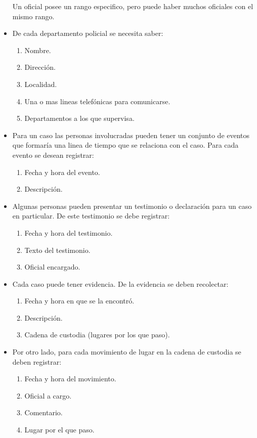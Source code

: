\documentclass{article}
\theoremstyle{definition}
\theoremstyle{remark}
\begin{document}
\begin{itemize}
    Un oficial posee un rango especifico, pero puede haber muchos oficiales con el mismo rango.
    \item De cada departamento policial se necesita saber:
        \begin{enumerate}
            \item Nombre.
            \item Dirección.
            \item Localidad.
            \item Una o mas lineas telefónicas para comunicarse.
            \item Departamentos a los que supervisa.
        \end{enumerate}
    \item Para un caso las personas involucradas pueden tener un conjunto de eventos que formaría una linea de tiempo que se relaciona con el caso. Para cada evento se desean registrar:
        \begin{enumerate}
            \item Fecha y hora del evento.
            \item Descripción.
        \end{enumerate}
    \pagebreak
    \item Algunas personas pueden presentar un testimonio o declaración para un caso en particular. De este testimonio se debe registrar:
        \begin{enumerate}
            \item Fecha y hora  del testimonio.
            \item Texto del testimonio.
            \item Oficial encargado.
        \end{enumerate}
    \item Cada caso puede tener evidencia. De la evidencia se deben recolectar:
        \begin{enumerate}
            \item Fecha y hora en que se la encontró.
            \item Descripción.
            \item Cadena de custodia (lugares por los que paso).
        \end{enumerate}
    \item Por otro lado, para cada movimiento de lugar en la cadena de custodia se deben registrar:
        \begin{enumerate}
            \item Fecha y hora del movimiento.
            \item Oficial a cargo.
            \item Comentario.
            \item Lugar por el que paso.
        \end{enumerate}
\end{itemize}
\end{document}
